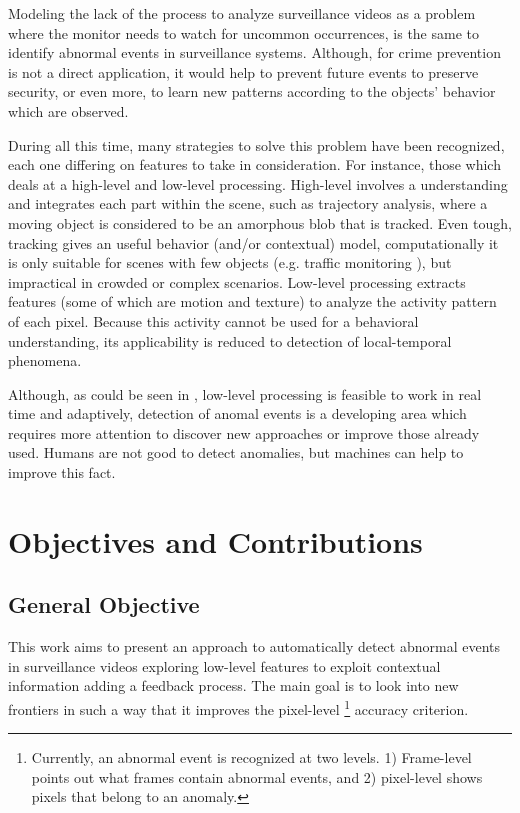 Modeling the lack of the process to analyze surveillance videos as a
problem where the monitor needs to watch for uncommon occurrences, is the
same to identify abnormal events in surveillance systems. Although, for crime
prevention is not a direct application, it would help to prevent future events
to preserve security, or even more, to learn new patterns according to the
objects' behavior which are observed.

During all this time, many strategies to solve this problem have been
recognized, each one differing on features to take in consideration.
For instance, those which deals at a high-level and low-level processing.
\cite{Dee:2007:HowClose} High-level involves a understanding and integrates each
part within the scene, such as trajectory analysis, where a moving object is
considered to be an amorphous blob that is tracked. Even tough, tracking gives
an useful behavior (and/or contextual) model, computationally it is only
suitable for scenes with few objects (e.g. traffic monitoring
\cite{Kamijo:2000:TrafficMonitoring}), but impractical in crowded or complex
scenarios. Low-level processing extracts features (some of which are motion and
texture) to analyze the activity pattern of each pixel. Because this activity
cannot be used for a behavioral understanding, its applicability is reduced to
detection of local-temporal phenomena.

Although, as could be seen in , low-level processing is
feasible to work in real time and adaptively, detection of anomal events is
a developing area which requires more attention to discover new approaches or
improve those already used. Humans are not good to detect anomalies, but
machines can help to improve this fact.

\section{Objectives and Contributions}
 \subsection{General Objective}
 This work aims to present an approach to automatically detect abnormal events
in surveillance videos exploring low-level features to exploit contextual
information adding a feedback process. The main goal is to look into new
frontiers in such a way that it improves the pixel-level \footnote{
Currently, an abnormal event is recognized at two levels. 1) Frame-level points
out what frames contain abnormal events, and 2) pixel-level shows pixels
that belong to an anomaly.} accuracy criterion.
